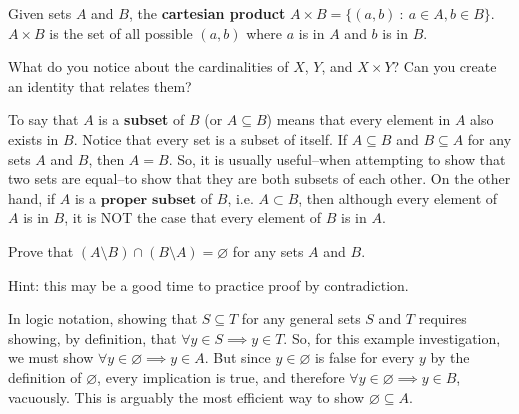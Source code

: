 \begin{definition}
    Given sets $A$ and $B$, the \textbf{cartesian product}  $A\times B = \{(a,b)\ :\ a\in A, b\in B\}$. $A\times B$ is the set of all possible $(a,b)$ where $a$ is in $A$ and $b$ is in $B$.
\end{definition}

\begin{exercise}
    What do you notice about the cardinalities of $X$, $Y$, and $X\times Y$? Can you create an identity that relates them?
\end{exercise}

To say that $A$ is a \textbf{subset} of $B$ (or $A\subseteq B$) means that every element in $A$ also exists in $B$. Notice that every set is a subset of itself. If $A\subseteq B$ and $B\subseteq A$ for any sets $A$ and $B$, then $A=B$. So, it is usually useful--when attempting to show that two sets are equal--to show that they are both subsets of each other. On the other hand, if $A$ is a $\textbf{proper subset}$ of $B$, i.e. $A\subset B$, then although every element of $A$ is in $B$, it is NOT the case that every element of $B$ is in $A$. 

\begin{exercise}
    Prove that $(A\setminus B) \cap (B\setminus A) =\varnothing$ for any sets $A$ and $B$. \par Hint: this may be a good time to practice proof by contradiction.

\end{exercise}


\begin{example}
    In logic notation, showing that $S\subseteq T$ for any general sets $S$ and $T$ requires showing, by definition, that $\forall y\in S \implies y\in T$. So, for this example investigation, we must show $\forall y\in\varnothing \implies y\in A$. But since $y\in\varnothing$ is false for every $y$ by the definition of $\varnothing$, every implication is true, and therefore $\forall y\in\varnothing \implies y\in B$, vacuously. This is arguably the most efficient way to show $\varnothing\subseteq A$.
\end{example}

